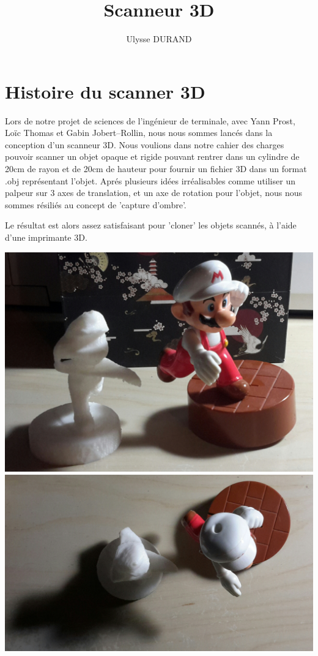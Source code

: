 \documentclass{article}
\begin{document}
\title{Scanneur 3D}
\author{Ulysse DURAND}
\date{}
\maketitle

\section*{Histoire du scanner 3D}

Lors de notre projet de sciences de l'ingénieur de terminale, avec
Yann Prost, Loïc Thomas et Gabin Jobert--Rollin, nous nous sommes
lancés dans la conception d'un scanneur 3D. Nous voulions dans notre
cahier des charges pouvoir scanner un objet opaque et rigide pouvant
rentrer dans un cylindre de 20cm de rayon et de 20cm de hauteur pour
fournir un fichier 3D dans un format .obj représentant l'objet. Aprés
plusieurs idées irréalisables comme utiliser un palpeur sur 3 axes
de translation, et un axe de rotation pour l'objet, nous nous sommes
résiliés au concept de 'capture d'ombre'.

Le résultat est alors assez satisfaisant pour 'cloner' les objets
scannés, à l'aide d'une imprimante 3D.

\includegraphics[scale=0.1]{10}\includegraphics[scale=0.1]{11}
\end{document}
